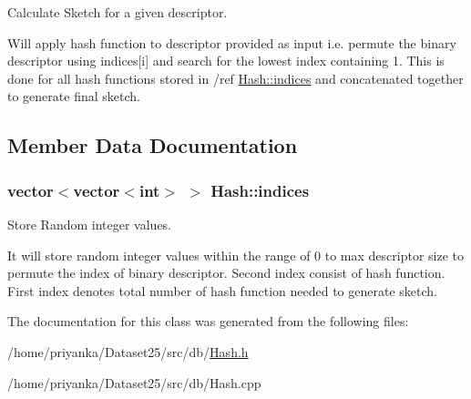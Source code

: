 \-Calculate \-Sketch for a given descriptor. 

\-Will apply hash function to descriptor provided as input i.\-e. permute the binary descriptor using indices\mbox{[}i\mbox{]} and search for the lowest index containing 1. \-This is done for all hash functions stored in /ref \hyperlink{classHash_a312855c01b7618ea56601216467354ee}{\-Hash\-::indices} and concatenated together to generate final sketch. 

\subsection{\-Member \-Data \-Documentation}
\hypertarget{classHash_a312855c01b7618ea56601216467354ee}{
\subsubsection[{indices}]{\setlength{\rightskip}{0pt plus 5cm}vector$<$vector$<$int$>$ $>$ {\bf \-Hash\-::indices}}}\label{classHash_a312855c01b7618ea56601216467354ee}


\-Store \-Random integer values. 

\-It will store random integer values within the range of 0 to max descriptor size to permute the index of binary descriptor. \-Second index consist of hash function. \-First index denotes total number of hash function needed to generate sketch. 

\-The documentation for this class was generated from the following files\-:\begin{DoxyCompactItemize}
\item 
/home/priyanka/\-Dataset25/src/db/\hyperlink{Hash_8h}{\-Hash.\-h}\item 
/home/priyanka/\-Dataset25/src/db/\-Hash.\-cpp\end{DoxyCompactItemize}
